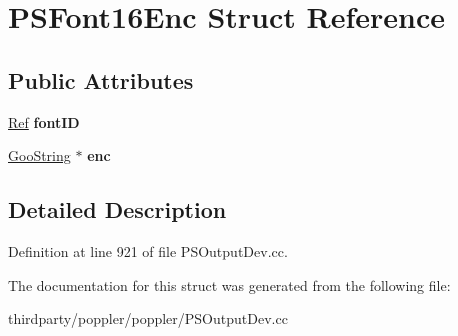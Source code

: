 \hypertarget{struct_p_s_font16_enc}{}\section{P\+S\+Font16\+Enc Struct Reference}
\label{struct_p_s_font16_enc}
\subsection*{Public Attributes}
\begin{DoxyCompactItemize}
\item 
\mbox{\label{struct_p_s_font16_enc_ae68ba94d958c1fa0acc6d473f7445d48}} 
\hyperlink{struct_ref}{Ref} {\bfseries font\+ID}
\item 
\mbox{\label{struct_p_s_font16_enc_a043b071cc6e64feeb1199e5c62ec73b4}} 
\hyperlink{class_goo_string}{Goo\+String} $\ast$ {\bfseries enc}
\end{DoxyCompactItemize}


\subsection{Detailed Description}


Definition at line 921 of file P\+S\+Output\+Dev.\+cc.



The documentation for this struct was generated from the following file\+:\begin{DoxyCompactItemize}
\item 
thirdparty/poppler/poppler/P\+S\+Output\+Dev.\+cc\end{DoxyCompactItemize}
